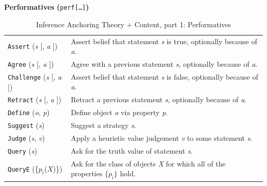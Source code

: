 \documentclass[smallextended,oneside]{svjour3}       %
\begin{document}
\begin{table}[ht]
\begin{mdframed}
{\centering
\textbf{Performatives} \textbf{(}\texttt{perf[\ldots]}\textbf{)}

\par}

\smallskip

\begin{tabular}{@{\hspace{-.25ex}}p{}p{}}
\texttt{Assert} (\emph{s} [, \emph{a} ]) & Assert belief that statement \emph{s} is true, optionally because of \emph{a}.\\
\texttt{Agree} (\emph{s} [, \emph{a} ]) & Agree with a previous statement \emph{s}, optionally because of \emph{a}.\\
\texttt{Challenge} (\emph{s} [, \emph{a} ]) & Assert belief that statement \emph{s} is false, optionally because of \emph{a}.\\
\texttt{Retract} (\emph{s} [, \emph{a} ]) & Retract a previous statement \emph{s}, optionally because of \emph{a}.\\
\texttt{Define} (\emph{o}, \emph{p}) & Define object \emph{o} via property \emph{p}.\\
\texttt{Suggest} (\emph{s}) & Suggest a strategy \emph{s}.\\
\texttt{Judge} (\emph{s}, \emph{v}) & Apply a heuristic value judgement \emph{v} to some statement \emph{s}.\\
\texttt{Query} (\emph{s}) & Ask for the truth value of statement \emph{s}.\\
\texttt{QueryE} (\{$p_i$($X$)\}) & Ask for the class of objects \emph{X} for which all of the properties $\{p_i\}$ hold.
\end{tabular}

\end{mdframed}
\caption{Inference Anchoring Theory + Content, part 1: Performatives\label{iatc-table:1}}
\end{table}

\newpage 
\end{document}
